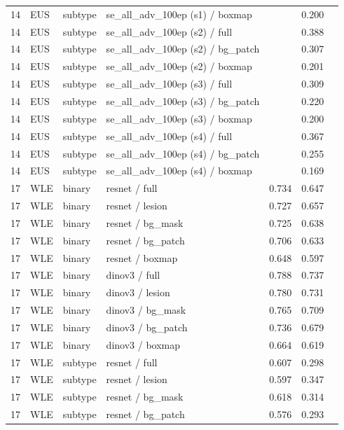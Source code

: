 \begin{longtable}{cL{1.1cm}L{1.5cm}L{5.6cm}ccc}
14 & EUS & subtype & se\_all\_adv\_100ep (s1) / boxmap & \nl{} & 0.200 & \nl{} \\
14 & EUS & subtype & se\_all\_adv\_100ep (s2) / full & \nl{} & 0.388 & \nl{} \\
14 & EUS & subtype & se\_all\_adv\_100ep (s2) / bg\_patch & \nl{} & 0.307 & \nl{} \\
14 & EUS & subtype & se\_all\_adv\_100ep (s2) / boxmap & \nl{} & 0.201 & \nl{} \\
14 & EUS & subtype & se\_all\_adv\_100ep (s3) / full & \nl{} & 0.309 & \nl{} \\
14 & EUS & subtype & se\_all\_adv\_100ep (s3) / bg\_patch & \nl{} & 0.220 & \nl{} \\
14 & EUS & subtype & se\_all\_adv\_100ep (s3) / boxmap & \nl{} & 0.200 & \nl{} \\
14 & EUS & subtype & se\_all\_adv\_100ep (s4) / full & \nl{} & 0.367 & \nl{} \\
14 & EUS & subtype & se\_all\_adv\_100ep (s4) / bg\_patch & \nl{} & 0.255 & \nl{} \\
14 & EUS & subtype & se\_all\_adv\_100ep (s4) / boxmap & \nl{} & 0.169 & \nl{} \\
17 & WLE & binary & resnet / full & 0.734 & 0.647 & \nl{} \\
17 & WLE & binary & resnet / lesion & 0.727 & 0.657 & \nl{} \\
17 & WLE & binary & resnet / bg\_mask & 0.725 & 0.638 & \nl{} \\
17 & WLE & binary & resnet / bg\_patch & 0.706 & 0.633 & \nl{} \\
17 & WLE & binary & resnet / boxmap & 0.648 & 0.597 & \nl{} \\
17 & WLE & binary & dinov3 / full & 0.788 & 0.737 & \nl{} \\
17 & WLE & binary & dinov3 / lesion & 0.780 & 0.731 & \nl{} \\
17 & WLE & binary & dinov3 / bg\_mask & 0.765 & 0.709 & \nl{} \\
17 & WLE & binary & dinov3 / bg\_patch & 0.736 & 0.679 & \nl{} \\
17 & WLE & binary & dinov3 / boxmap & 0.664 & 0.619 & \nl{} \\
17 & WLE & subtype & resnet / full & 0.607 & 0.298 & \nl{} \\
17 & WLE & subtype & resnet / lesion & 0.597 & 0.347 & \nl{} \\
17 & WLE & subtype & resnet / bg\_mask & 0.618 & 0.314 & \nl{} \\
17 & WLE & subtype & resnet / bg\_patch & 0.576 & 0.293 & \nl{} \\

\end{longtable}

